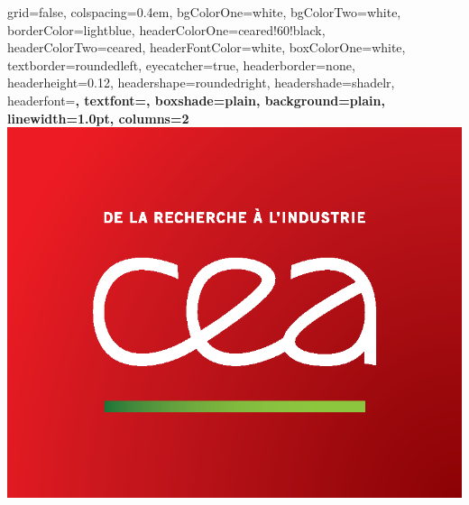 \documentclass[a0paper,portrait, fontscale=0.30]{baposter}
\begin{document}
\begin{poster}
{  
            grid=false,
            colspacing=0.4em,
            bgColorOne=white,
            bgColorTwo=white,
            borderColor=lightblue,		%
            headerColorOne=ceared!60!black, 		%
            headerColorTwo=ceared,	%
            headerFontColor=white,		%
            boxColorOne=white, 		%
            textborder=roundedleft,
            eyecatcher=true,
           	headerborder=none,		%
            headerheight=0.12\textheight,
            headershape=roundedright,	%
            headershade=shadelr,
            headerfont=\Large\bf\textsc, %
            textfont={\setlength{\parindent}{1.00em}},%
            boxshade=plain,
            background=plain,
            linewidth=1.0pt,%
            columns=2
}
{\includegraphics[scale=0.3]{logo_cea}}
{ \textcolor{red}{\Large \hspace{33pt} 
}}
\end{poster}
\end{document}
